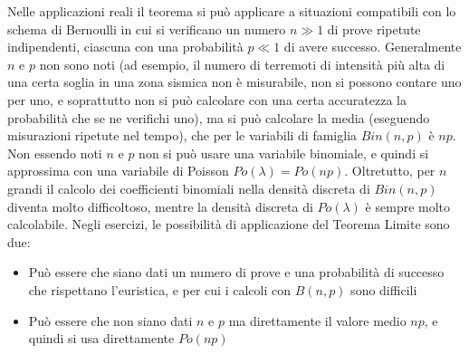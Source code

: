 \documentclass{article}
\theoremstyle{plain}
\theoremstyle{definition}
\theoremstyle{remark}
\begin{document}
Nelle applicazioni reali il teorema si può applicare a situazioni compatibili con lo schema di Bernoulli in cui si verificano un numero $n\gg1$ di prove ripetute indipendenti, ciascuna con una probabilità $p\ll1$ di avere successo. Generalmente $n$ e $p$ non sono noti (ad esempio, il numero di terremoti di intensità più alta di una certa soglia in una zona sismica non è misurabile, non si possono contare uno per uno, e soprattutto non si può calcolare con una certa accuratezza la probabilità che se ne verifichi uno), ma si può calcolare la media (eseguendo misurazioni ripetute nel tempo), che per le variabili di famiglia $Bin(n,p)$ è $np$. Non essendo noti $n$ e $p$ non si può usare una variabile binomiale, e quindi si approssima con una variabile di Poisson $Po(\lambda)=Po(np)$. Oltretutto, per $n$ grandi il calcolo dei coefficienti binomiali nella densità discreta di $Bin(n,p)$ diventa molto difficoltoso, mentre la densità discreta di $Po(\lambda)$ è sempre molto calcolabile. Negli esercizi, le possibilità di applicazione del Teorema Limite sono due:
\begin{itemize}
	\item Può essere che siano dati un numero di prove e una probabilità di successo che rispettano l'euristica, e per cui i calcoli con $B(n,p)$ sono difficili
	\item Può essere che non siano dati $n$ e $p$ ma direttamente il valore medio $np$, e quindi si usa direttamente $Po(np)$
\end{itemize}
\end{document}
